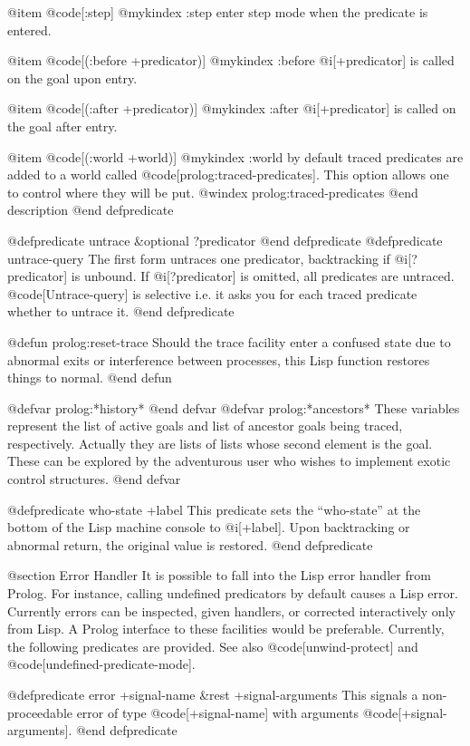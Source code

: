 {@item @code[:step]
@mykindex :step
enter step mode when the predicate is entered.

@item @code[(:before +predicator)]
@mykindex :before
@i[+predicator] is called on the goal upon entry.

@item @code[(:after +predicator)]
@mykindex :after
@i[+predicator] is called on the goal after entry.

@item @code[(:world +world)]
@mykindex :world
by default traced predicates are added to a world called 
@code[prolog:traced-predicates]. This option allows one to control 
where they will be put.
@windex prolog:traced-predicates
@end description
@end defpredicate

@defpredicate untrace &optional ?predicator
@end defpredicate
@defpredicate untrace-query
The first form untraces one predicator, backtracking if @i[?predicator]
is unbound. If @i[?predicator] is omitted, all predicates are untraced. 
@code[Untrace-query] is selective
i.e. it asks you for each traced predicate whether to untrace it.
@end defpredicate

@defun prolog:reset-trace
Should the trace facility enter a confused state
due to abnormal exits or interference between processes, this
Lisp function restores things to normal.
@end defun

@defvar prolog:*history*
@end defvar
@defvar prolog:*ancestors*
These variables represent the list of active goals and list of ancestor goals
being traced, respectively.  Actually they are lists of lists whose second
element is the goal.  These can be explored by the adventurous user who wishes
to implement exotic control structures.
@end defvar

@defpredicate who-state +label
This predicate sets the ``who-state'' at the bottom of the Lisp machine console
to @i[+label].  Upon backtracking or abnormal return, the original value
is restored.
@end defpredicate

@section Error Handler
It is possible to fall into the Lisp error handler from Prolog.  For
instance, calling undefined predicators by default causes a Lisp error.
Currently errors can be inspected, given
handlers, or corrected interactively only from Lisp.  A Prolog
interface to these facilities would be preferable.
Currently, the following predicates are provided. See also
@code[unwind-protect] and @code[undefined-predicate-mode].

@defpredicate error +signal-name &rest +signal-arguments
This signals a non-proceedable error of type @code[+signal-name] with
arguments @code[+signal-arguments].
@end defpredicate

}
